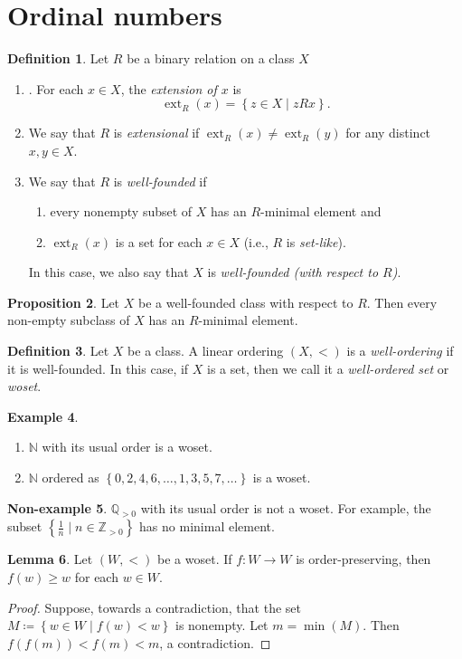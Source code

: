 \documentclass[10pt,letterpaper,cm]{nupset}
\theoremstyle{definition}
\newtheorem{definition}{Definition}[subsection]
\newtheorem{exmp}[definition]{Example}
\newtheorem{non-exmp}[definition]{Non-example}
\theoremstyle{theorem}
\newtheorem{lemma}[definition]{Lemma}
\newtheorem{prop}[definition]{Proposition}
\theoremstyle{remark}
\newcommand{\N}{\mathbb N}
\newcommand{\Q}{\mathbb Q}
\newcommand{\Z}{\mathbb Z}
\newcommand{\1}{\mathbf{1}}
\newcommand{\0}{\vec 0}
\DeclareMathOperator{\ext}{ext}
\newcommand{\be}{\begin{enumerate}}
\newcommand{\ee}{\end{enumerate}}
\begin{document}
\section{Ordinal numbers}

\begin{definition}  Let $R$ be a binary relation on a class $X$
\be
\item. For each $x\in X$, the \textit{extension of $x$} is $$\ext_R(x) = \left\{z\in X \mid zRx\right\}    .$$
\item We say that $R$ is \textit{extensional} if $\ext_R(x) \ne \ext_R(y)$ for any distinct $x,y \in X$.
\item We say that $R$ is \textit{well-founded} if 
 \be
 \item every nonempty subset of $X$ has an $R$-minimal element and
 \item $\ext_R(x)$ is a set for each $x\in X$ (i.e., $R$ is \textit{set-like}).
 \ee
 In this case, we also say that $X$ is \textit{well-founded (with respect to $R$)}. 
\ee
 \end{definition}

\begin{prop}
Let $X$ be a well-founded class with respect to $R$. Then every non-empty subclass of $X$ has an $R$-minimal element.
\end{prop}

\begin{definition}
Let $X$ be a class. A linear ordering $\left(X, <\right)$ is a \textit{well-ordering} if it is well-founded. 
In this case, if $X$ is a set, then we call it a \textit{well-ordered set} or \textit{woset}.
\end{definition}

\begin{exmp} $ $
\begin{enumerate}
\item $\N$ with its usual order is a woset. 
\item $\N$ ordered as $\left\{0, 2, 4, 6, \ldots, 1, 3, 5, 7, \ldots\right\}$ is a woset.
\end{enumerate}
\end{exmp}

\begin{non-exmp}
$\Q_{>0}$ with its usual order is not a woset. For example, the subset $\left\{\frac{1}{n} \mid n \in \Z_{>0}\right\}$ has no minimal element. 
\end{non-exmp}

\begin{lemma}\label{woprop}
Let $\left(W, <\right)$ be a woset. If $f: W \to W$ is order-preserving, then $f(w) \geq w$ for each $w\in W$.
\end{lemma}
\begin{proof}
Suppose, towards a contradiction, that the set $M \coloneqq \left\{w\in W \mid f(w) <w\right\}$ is nonempty. Let $m = \min(M)$. Then $f(f(m))< f(m) < m$, a contradiction. 
\end{proof}
\end{document}
